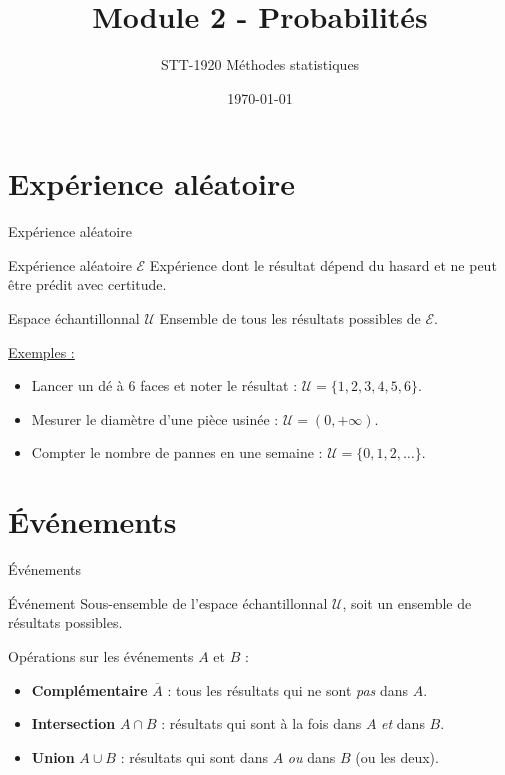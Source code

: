 \documentclass{BeamerTemplate}
\title{Module 2 - Probabilités}
\subtitle{STT-1920 Méthodes statistiques}
\date{\today}
\begin{document}
\begin{frame}[t]
  \titlepage
\end{frame}

\section{Expérience aléatoire}

\begin{frame}[t]{Expérience aléatoire}

\begin{Boite}{Expérience aléatoire $\mathcal{E}$}
Expérience dont le résultat dépend du hasard et ne peut être prédit avec certitude.
\end{Boite}

\medskip

\begin{Boite}{Espace échantillonnal $\mathcal{U}$}
Ensemble de tous les résultats possibles de $\mathcal{E}$.
\end{Boite}

\medskip
\underline{Exemples :}
\begin{itemize}\itemsep3mm
  \item Lancer un dé à 6 faces et noter le résultat : $\mathcal{U} = \{1, 2, 3, 4, 5, 6\}$.
  \item Mesurer le diamètre d'une pièce usinée : $\mathcal{U} = (0, +\infty)$.
  \item Compter le nombre de pannes en une semaine : $\mathcal{U} = \{0, 1, 2, \ldots\}$.
\end{itemize}

\end{frame}

\section{Événements}

\begin{frame}[t]{Événements}

\begin{Boite}{Événement}
Sous-ensemble de l'espace échantillonnal $\mathcal{U}$, soit un ensemble de résultats possibles.
\end{Boite}

\medskip
Opérations sur les événements $A$ et $B$ :
\begin{itemize}\itemsep5mm
  \item \textbf{Complémentaire} $\overline{A}$ : tous les résultats qui ne sont \emph{pas} dans $A$.
  \item \textbf{Intersection} $A \cap B$ : résultats qui sont à la fois dans $A$ \emph{et} dans $B$.
  \item \textbf{Union} $A \cup B$ : résultats qui sont dans $A$ \emph{ou} dans $B$ (ou les deux).
\end{itemize}

\end{frame}
\end{document}
